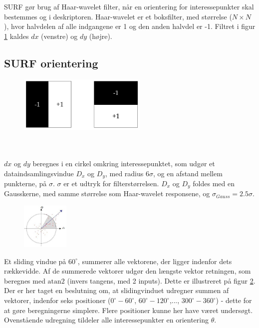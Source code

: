 SURF gør brug af Haar-wavelet filter, når en orientering for interessepunkter skal bestemmes og i deskriptoren. Haar-wavelet er et boksfilter, med størrelse ($N\times N$), hvor halvdelen af alle indgangene er 1 og den anden halvdel er -1. Filtret i figur \ref{fig:haarwavelet} kaldes $dx$ (venstre) og $dy$ (højre).
\subsection{SURF orientering}
\begin{figure}[H]
    \centering
    \includegraphics[width=0.55\textwidth]{fig/haarwavelet.png}
     \vspace{-1em}
    \begin{center}    
       \caption{\textcolor{gray}{\footnotesize \textit{ }}}
    \label{fig:haarwavelet}
     \end{center}
     \vspace{-2.5em}
  \end{figure} \noindent
\\
\\
$dx$ og $dy$ beregnes i en cirkel omkring interessepunktet, som udgør et dataindsamlingsvindue $D_x$ og $D_y$, med radius $6\sigma$, og en afstand mellem punkterne, på $\sigma$. $\sigma$ er et udtryk for filterstørrelsen. $D_x$ og $D_y$ foldes med en Gausskerne, med samme størrelse som Haar-wavelet responsene, og $\sigma_{Gauss} = 2.5\sigma$.
\begin{figure}[H]
    \centering
    \includegraphics[width=0.2\textwidth]{fig/surforientation.jpg}
     \vspace{-1em}
    \begin{center}    
       \caption{\textcolor{gray}{\footnotesize \textit{ }}}
    \label{fig:surforientation}
     \end{center}
     \vspace{-2.5em}
  \end{figure} \noindent
Et sliding vindue på $60^{\circ}$, summerer alle vektorene, der ligger indenfor dets rækkevidde. Af de summerede vektorer udgør den længste vektor retningen, som beregnes med $\text{atan2}$ (invers tangens, med 2 inputs). Dette er illustreret på figur \ref{fig:surforientation}. Der er her taget en beslutning om, at slidingvinduet udregner summen af vektorer, indenfor seks positioner ($0^{\circ}-60^{\circ}$, $60^{\circ}-120^{\circ}$,..., $300^{\circ}-360^{\circ}$) - dette for at gøre beregningerne simplere. Flere positioner kunne her have været undersøgt.
\\
Ovenstående udregning tildeler alle interessepunkter en orientering $\theta$.
